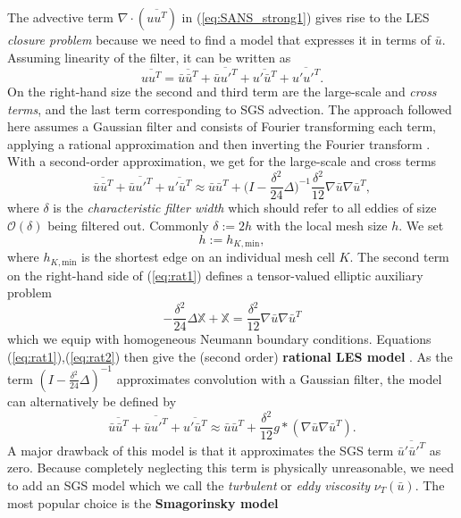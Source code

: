 \documentclass[a4paper, 11pt, twoside]{article}
\begin{document}
The advective term  $\nabla \cdot (\overline{uu^T})$ in (\ref{eq:SANS_strong1}) gives rise to the LES \textit{closure problem}  because we need to find a model that expresses it in terms of $\bar{u}$. Assuming linearity of the filter, it can be written as \begin{equation}
\label{eq:adv}
    \overline{uu^T} = \overline{\bar{u}\bar{u}^T} + \overline{\bar{u}u'^T} + \overline{u'\bar{u}^T} + \overline{u'u'^T}.
\end{equation}
On the right-hand size the second and third term are the large-scale and \textit{cross terms}, and the last term corresponding to SGS advection. The approach followed here assumes a Gaussian filter  and consists of Fourier transforming each term, applying a rational approximation  and then inverting the Fourier transform \cite[p.541-551]{John}. With a second-order approximation, we get for the large-scale and cross terms \begin{equation}
\label{eq:rat1}
    \overline{\bar{u}\bar{u}^T} + \overline{\bar{u}u'^T} + \overline{u'\bar{u}^T} \approx \bar{u}\bar{u}^T + \big(I - \frac{\delta^2}{24}\Delta\big)^{-1}\frac{\delta^2}{12}\nabla \bar{u} \nabla \bar{u}^T,
\end{equation} where $\delta$ is the \textit{characteristic filter width}  which should refer to all eddies of size $\mathcal{O}(\delta)$ being filtered out. Commonly $\delta := 2h$ with the local mesh size $h$. We set \begin{equation}
    h := h_{K,\text{min}},
\end{equation} where $h_{K,\text{min}}$ is the shortest edge on an individual mesh cell $K$. The second term on the right-hand side of (\ref{eq:rat1}) defines a tensor-valued elliptic auxiliary problem  \begin{equation}
\label{eq:rat2}
    -\frac{\delta^2}{24}\Delta \mathbb{X} + \mathbb{X} = \frac{\delta^2}{12}\nabla \bar{u} \nabla \bar{u}^T
\end{equation} which we equip with homogeneous Neumann boundary conditions. Equations (\ref{eq:rat1}),(\ref{eq:rat2}) then give the (second order) \textbf{rational LES model} . As the term $(I-\frac{\delta^2}{24}\Delta)^{-1}$ approximates convolution with a Gaussian filter, the model can alternatively be defined by \begin{equation}
\label{eq:ratconv}
    \overline{\bar{u}\bar{u}^T} + \overline{\bar{u}u'^T} + \overline{u'\bar{u}^T} \approx \bar{u}\bar{u}^T + \frac{\delta^2}{12}g*(\nabla \bar{u} \nabla \bar{u}^T).
\end{equation} A major drawback of this model is that it approximates the SGS term $\overline{\bar{u}'\bar{u}'^T}$ as zero. Because completely neglecting this term is physically unreasonable, we need to add an SGS model which we call the \textit{turbulent} or \textit{eddy viscosity}   $\nu_T(\bar{u})$. The most popular choice is the \textbf{Smagorinsky model} \cite{Smagorinsky} 
\end{document}
